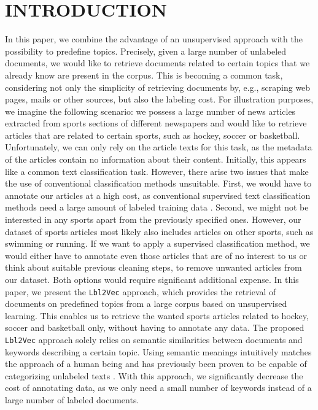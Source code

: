 \documentclass[a4paper,twoside]{article}
\begin{document}
\section{\uppercase{Introduction}}
\label{sec:introduction}

In this paper, we combine the advantage of an unsupervised approach with the possibility to predefine topics. Precisely, given a large number of unlabeled documents, we would like to retrieve documents related to certain topics that we already know are present in the corpus. This is becoming a common task, considering not only the simplicity of retrieving documents by, e.g., scraping web pages, mails or other sources, but also the labeling cost. For illustration purposes, we imagine the following scenario: we possess a large number of news articles extracted from sports sections of different newspapers and would like to retrieve articles that are related to certain sports, such as hockey, soccer or basketball. Unfortunately, we can only rely on the article texts for this task, as the metadata of the articles contain no information about their content. Initially, this appears like a common text classification task. However, there arise two issues that make the use of conventional classification methods unsuitable. First, we would have to annotate our articles at a high cost, as conventional supervised text classification methods need a large amount of labeled training data \citep{Zhang2020}. Second, we might not be interested in any sports apart from the previously specified ones. However, our dataset of sports articles most likely also includes articles on other sports, such as swimming or running. If we want to apply a supervised classification method, we would either have to annotate even those articles that are of no interest to us or think about suitable previous cleaning steps, to remove unwanted articles from our dataset. Both options would require significant additional expense. 
\newline In this paper, we present the \texttt{Lbl2Vec} approach, which provides the retrieval of documents on predefined topics from a large corpus based on unsupervised learning. This enables us to retrieve the wanted sports articles related to hockey, soccer and basketball only, without having to annotate any data. The proposed \texttt{Lbl2Vec} approach solely relies on semantic similarities between documents and keywords describing a certain topic. Using semantic meanings intuitively matches the approach of a human being and has previously been proven to be capable of categorizing unlabeled texts \citep{Chang2008ImportanceOS}. With this approach, we significantly decrease the cost of annotating data, as we only need a small number of keywords instead of a large number of labeled documents. \newline
\end{document}
